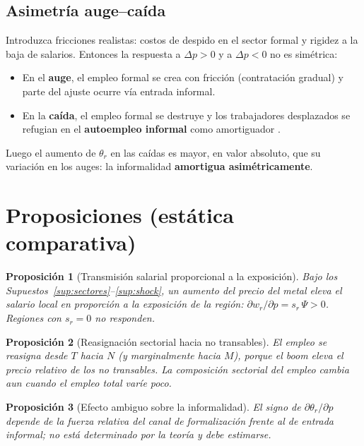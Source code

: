 \documentclass[11pt]{article}
\theoremstyle{definition}
\theoremstyle{plain}
\newtheorem{prop}{Proposición}
\begin{document}
\subsection{Asimetría auge--caída}
Introduzca fricciones realistas: costos de despido en el sector formal y rigidez a la baja de
salarios. Entonces la respuesta a $\Delta p>0$ y a $\Delta p<0$ no es simétrica:
\begin{itemize}[leftmargin=1.6em, itemsep=1pt]
  \item En el \textbf{auge}, el empleo formal se crea con fricción (contratación gradual) y
  parte del ajuste ocurre vía entrada informal.
  \item En la \textbf{caída}, el empleo formal se destruye y los trabajadores desplazados se
  refugian en el \textbf{autoempleo informal} como amortiguador \citep{dixcarneiro2017}.
\end{itemize}
Luego el aumento de $\theta_r$ en las caídas es mayor, en valor absoluto, que su variación en
los auges: la informalidad \textbf{amortigua asimétricamente}.

\section{Proposiciones (estática comparativa)}

\begin{prop}[Transmisión salarial proporcional a la exposición]\label{prop:w}
Bajo los Supuestos~\ref{sup:sectores}--\ref{sup:shock}, un aumento del precio del metal eleva
el salario local en proporción a la exposición de la región:
$\partial w_r/\partial p = s_r\,\Psi>0$. Regiones con $s_r=0$ no responden.
\end{prop}

\begin{prop}[Reasignación sectorial hacia no transables]\label{prop:reasig}
El empleo se reasigna desde $T$ hacia $N$ (y marginalmente hacia $M$), porque el boom eleva el
precio relativo de los no transables. La composición sectorial del empleo cambia aun cuando el
empleo total varíe poco.
\end{prop}

\begin{prop}[Efecto ambiguo sobre la informalidad]\label{prop:info}
El signo de $\partial \theta_r/\partial p$ depende de la fuerza relativa del canal de
formalización frente al de entrada informal; no está determinado por la teoría y debe
estimarse.
\end{prop}
\end{document}
